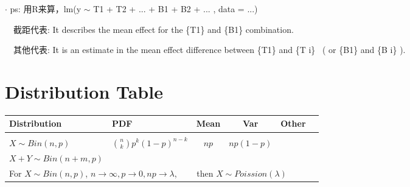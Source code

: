 \documentclass[9pt]{article}
\begin{document}
$\cdot$ ps: 用R来算，lm(y $\sim$ T1 + T2 + ... + B1 + B2 + ... , data = ...)

    \ \ 截距代表: It describes the mean effect for the \{T1\} and \{B1\} combination.

    \ \ 其他代表: It is an estimate in the mean effect difference between \{T1\} and \{T i\} \ ( or \{B1\} and \{B i\} ).

    \section{Distribution Table} %

    \vspace{-0.4cm}
    \begin{longtable}{|l||l|c|c|c|l|}
        \hline
        Distribution                                                                                              & PDF                                                                                                                                                     & Mean                           & Var                                                    & Other                                                                                                                                                                                      \\
        \hline
        \hline
        \begin{tabular}{@{}p{4.05cm}@{}}Binomial \\ $X\sim Bin(n,p)$\end{tabular}                                 & $\binom{n}{k}p^k(1-p)^{n-k}$                                                                                                                            & $np$                           & $np(1-p)$                                              & \begin{tabular}{@{}l@{}}$X,Y\sim Bin(n,p),Bin(m,p)$ \\ $X+Y\sim Bin(n+m,p)$\end{tabular}                                                                                                   \\
        \hline
        \multicolumn{5}{|l|}{For $X\sim Bin(n,p)$, $n\to\infty,p\to0,np\to \lambda$, \ \ \ \ then $X\sim Poission(\lambda)$}                                                                                                                                                                                                                                                                                                                                                                                                                                       \\

\end{longtable}
\end{document}
